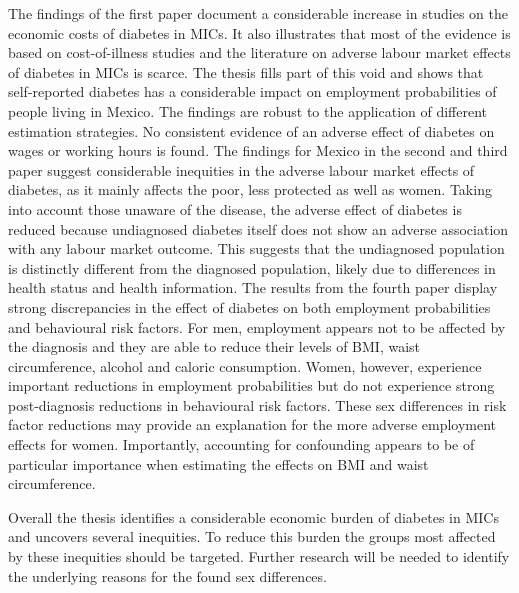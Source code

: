 The findings of the first paper document a considerable increase in studies on the economic costs of diabetes in \acp{MIC}. It also illustrates that most of the evidence is based on cost-of-illness studies and the literature on adverse labour market effects of diabetes in \acp{MIC} is scarce. The thesis fills part of this void and shows that self-reported diabetes has a considerable impact on employment probabilities of people living in Mexico. The findings are robust to the application of different estimation strategies. No consistent evidence of an adverse effect of diabetes on wages or working hours is found. The findings for Mexico in the second and third paper suggest considerable inequities in the adverse labour market effects of diabetes, as it mainly affects the poor, less protected as well as women. Taking into account those unaware of the disease, the adverse effect of diabetes is reduced because undiagnosed diabetes itself does not show an adverse association with any labour market outcome. This suggests that the undiagnosed population is distinctly different from the diagnosed population, likely due to differences in health status and health information. The results from the fourth paper display strong discrepancies in the effect of diabetes on both employment probabilities and behavioural risk factors. For men, employment appears not to be affected by the diagnosis and they are able to reduce their levels of \ac{BMI}, waist circumference, alcohol and caloric consumption. Women, however, experience important reductions in employment probabilities but do not experience strong post-diagnosis reductions in behavioural risk factors. These sex differences in risk factor reductions may provide an explanation for the more adverse employment effects for women. Importantly, accounting for confounding appears to be of particular importance when estimating the effects on \ac{BMI} and waist circumference.

Overall the thesis identifies a considerable economic burden of diabetes in \acp{MIC} and uncovers several inequities. To reduce this burden the groups most affected by these inequities should be targeted. Further research will be needed to identify the underlying reasons for the found sex differences.

